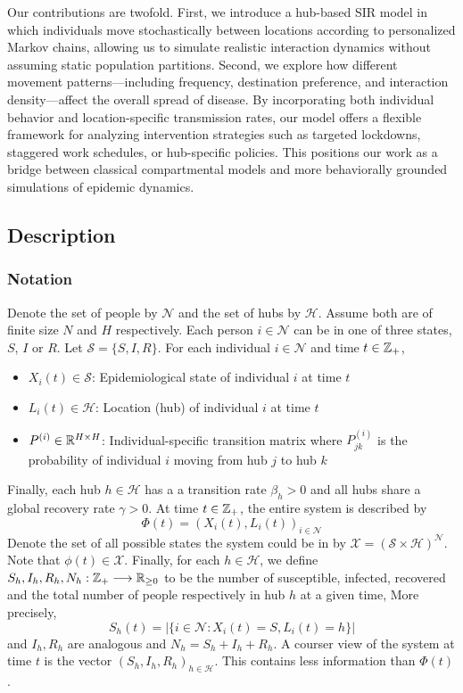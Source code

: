 \documentclass[12pt]{article}
\begin{document}
Our contributions are twofold. First, we introduce a hub-based SIR model in which individuals move stochastically between locations according to personalized Markov chains, allowing us to simulate realistic interaction dynamics without assuming static population partitions. Second, we explore how different movement patterns—including frequency, destination preference, and interaction density—affect the overall spread of disease. By incorporating both individual behavior and location-specific transmission rates, our model offers a flexible framework for analyzing intervention strategies such as targeted lockdowns, staggered work schedules, or hub-specific policies. This positions our work as a bridge between classical compartmental models and more behaviorally grounded simulations of epidemic dynamics.
\subsection{Description}
\subsubsection{Notation}
Denote the set of people by $\mathcal{N}$ and the set of hubs by $\mathcal{H}$. Assume both are of finite size $N$ and $H$ respectively. Each person $i \in \mathcal{N}$ can be in one of three states, $S$, $I$ or $R$. Let $\mathcal{S} = \{S, I, R\}$. For each individual $i \in \mathcal{N}$ and time $t \in \mathbb{Z}_{+}$,
\begin{itemize}
    \item $X_{i}(t) \in \mathcal{S}$: Epidemiological state of individual $i$ at time $t$
    \item $L_{i}(t) \in \mathcal{H}$: Location (hub) of individual $i$ at time $t$
    \item $P^{(i)} \in \mathbb{R}^{H \times H}$: Individual-specific transition matrix where $P_{jk}^{(i)}$ is the probability of individual $i$ moving from hub $j$ to hub $k$
\end{itemize}
Finally, each hub $h \in \mathcal{H}$ has a a transition rate $\beta_{h} > 0$ and all hubs share a global recovery rate $\gamma > 0$. At time $t \in \mathbb{Z}_{+}$, the entire system is described by
$$\Phi(t) = (X_{i}(t), L_{i}(t))_{i \in \mathcal{N}}$$
Denote the set of all possible states the system could be in by $\mathcal{X} = (\mathcal{S} \times \mathcal{H})^{\mathcal{N}}$. Note that $\phi(t) \in \mathcal{X}$. Finally, for each $h \in \mathcal{H}$, we define $S_{h}, I_{h}, R_{h}, N_{h}: \mathbb{Z}_{+} \longrightarrow \mathbb{R}_{\geq 0}$ to be the number of susceptible, infected, recovered and the total number of people respectively in hub $h$ at a given time, More precisely,
    $$S_{h}(t) = |\{i \in \mathcal{N}: X_{i}(t) = S, L_{i}(t) = h\}|$$
and $I_{h}, R_{h}$ are analogous and $N_{h} = S_{h} + I_{h} + R_{h}$. A courser view of the system at time $t$ is the vector $(S_{h}, I_{h}, R_{h})_{h \in \mathcal{H}}$. This contains less information than $\Phi(t)$.
\end{document}
